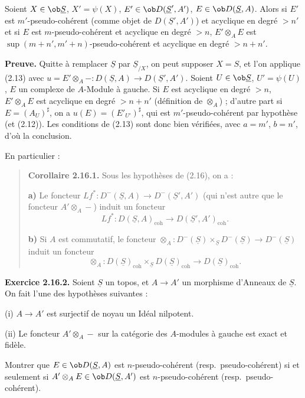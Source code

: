 Soient $X \in \ob \underline{S}$, $X' = \psi(X)$, $E' \in \ob D(\underline{S}', A')$, $E \in \ob D(\underline{S}, A)$. Alors si $E'$ est $m'$-pseudo-cohérent (comme objet de $D(\underline{S}', A')$) et acyclique en degré $> n'$ et si $E$ est $m$-pseudo-cohérent et acyclique en degré $> n$, $E' \otimes_A E$ est $\sup(m+n', m'+n)$-pseudo-cohérent et acyclique en degré $> n+n'$.

\textbf{Preuve.} Quitte à remplacer $\underline{S}$ par $\underline{S}_{/X}$, on peut supposer $X = S$, et l'on applique (2.13) avec $u = E' \otimes_A - : D(\underline{S}, A) \to D(\underline{S}', A')$. Soient $U \in \ob \underline{S}$, $U' = \psi(U)$, $E$ un complexe de $A$-Module à gauche. Si $E$ est acyclique en degré $> n$, $E' \otimes_A E$ est acyclique en degré $> n+n'$ (définition de $\otimes_A$) ; d'autre part si $E = (A_U)^\sharp$, on a $u(E) = (E'_{U'})^\sharp$, qui est $m'$-pseudo-cohérent par hypothèse (et (2.12)). Les conditions de (2.13) sont donc bien vérifiées, avec $a = m'$, $b = n'$, d'où la conclusion.

En particulier :

\begin{quote}
\textbf{Corollaire 2.16.1.} Sous les hypothèses de (2.16), on a :

\textbf{a)} Le foncteur $Lf^* : D^-(\underline{S}, A) \to D^-(\underline{S}', A')$ (qui n'est autre que le foncteur $A' \otimes_A -$) induit un foncteur
\[
Lf^* : D(\underline{S}, A)_{\mathrm{coh}} \longrightarrow D(\underline{S}', A')_{\mathrm{coh}}.
\]

\textbf{b)} Si $A$ est commutatif, le foncteur $\otimes_A : D^-(\underline{S}) \times_{\underline{S}} D^-(\underline{S}) \to D^-(\underline{S})$ induit un foncteur
\[
\otimes_A : D(\underline{S})_{\mathrm{coh}} \times_{\underline{S}} D(\underline{S})_{\mathrm{coh}} \longrightarrow D(\underline{S})_{\mathrm{coh}}.
\]
\end{quote}

\textbf{Exercice 2.16.2.} Soient $\underline{S}$ un topos, et $A \to A'$ un morphisme d'Anneaux de $\underline{S}$. On fait l'une des hypothèses suivantes :

(i) $A \to A'$ est surjectif de noyau un Idéal nilpotent.

(ii) Le foncteur $A' \otimes_A -$ sur la catégorie des $A$-modules à gauche est exact et fidèle.

Montrer que $E \in \ob D(\underline{S}, A)$ est $n$-pseudo-cohérent (resp.\ pseudo-cohérent) si et seulement si $A' \otimes_A E \in \ob D(\underline{S}, A')$ est $n$-pseudo-cohérent (resp.\ pseudo-cohérent).

